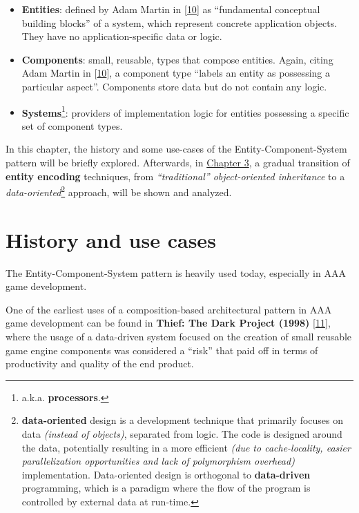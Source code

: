 \documentclass[oneside, 12pt, a4paper, openany]{book}
\begin{document}
\begin{itemize}
\item
  \textbf{Entities}: defined by Adam Martin in
  {[}\protect\hyperlink{ref-tmachine_esmmogfuturep2_2007}{10}{]} as
  ``fundamental conceptual building blocks'' of a system, which
  represent concrete application objects. They have no
  application-specific data or logic.
\item
  \textbf{Components}: small, reusable, types that compose entities.
  Again, citing Adam Martin in
  {[}\protect\hyperlink{ref-tmachine_esmmogfuturep2_2007}{10}{]}, a
  component type ``labels an entity as possessing a particular aspect''.
  Components store data but do not contain any logic.
\item
  \textbf{Systems}\footnote{a.k.a. \textbf{processors}.}: providers of
  implementation logic for entities possessing a specific set of
  component types.
\end{itemize}

In this chapter, the history and some use-cases of the
Entity-Component-System pattern will be briefly explored. Afterwards, in
\protect\hyperlink{chapter_encoding_entities}{Chapter 3}, a gradual
transition of \textbf{entity encoding} techniques, from
\emph{``traditional'' object-oriented inheritance} to a
\emph{data-oriented}\footnote{\textbf{data-oriented} design is a
  development technique that primarily focuses on data \emph{(instead of
  objects)}, separated from logic. The code is designed around the data,
  potentially resulting in a more efficient \emph{(due to
  cache-locality, easier parallelization opportunities and lack of
  polymorphism overhead)} implementation. Data-oriented design is
  orthogonal to \textbf{data-driven} programming, which is a paradigm
  where the flow of the program is controlled by external data at
  run-time.} approach, will be shown and analyzed.

\section{History and use cases}\label{history-and-use-cases}

The Entity-Component-System pattern is heavily used today, especially in
AAA game development.

One of the earliest uses of a composition-based architectural pattern in
AAA game development can be found in \textbf{Thief: The Dark Project
(1998)}
{[}\protect\hyperlink{ref-tomleonard_thiefpostmortem_1999}{11}{]}, where
the usage of a data-driven system focused on the creation of small
reusable game engine components was considered a ``risk'' that paid off
in terms of productivity and quality of the end product.
\end{document}
